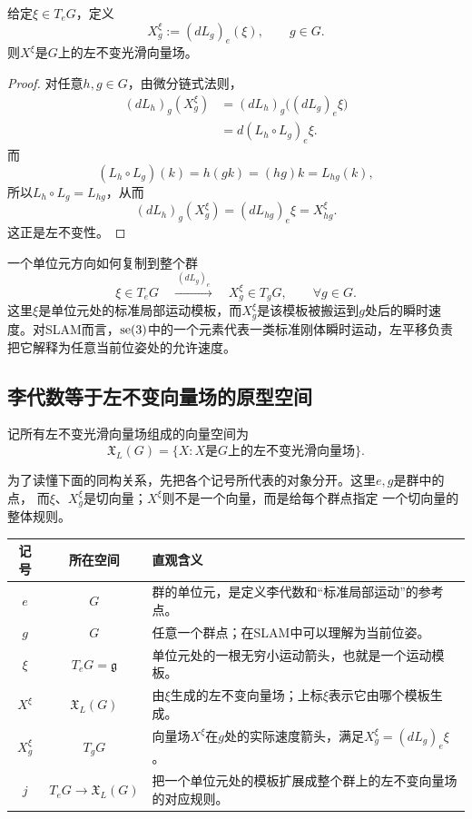 \begin{proposition}[单位元切向量生成左不变向量场]
给定$\xi\in T_eG$，定义
\[
    X^\xi_g:=(dL_g)_e(\xi),
    \qquad g\in G.
\]
则$X^\xi$是$G$上的左不变光滑向量场。
\end{proposition}

\begin{proof}
对任意$h,g\in G$，由微分链式法则，
\[
\begin{aligned}
    (dL_h)_g(X^\xi_g)
    &=(dL_h)_g\bigl((dL_g)_e\xi\bigr)\\
    &=d(L_h\circ L_g)_e\xi.
\end{aligned}
\]
而
\[
    (L_h\circ L_g)(k)=h(gk)=(hg)k=L_{hg}(k),
\]
所以$L_h\circ L_g=L_{hg}$，从而
\[
    (dL_h)_g(X^\xi_g)=(dL_{hg})_e\xi=X^\xi_{hg}.
\]
这正是左不变性。
\end{proof}

\begin{lieexample}{一个单位元方向如何复制到整个群}
\[
    \xi\in T_eG
    \quad\xrightarrow{\ (dL_g)_e\ }\quad
    X^\xi_g\in T_gG,
    \qquad\forall g\in G.
\]
这里$\xi$是单位元处的标准局部运动模板，而$X^\xi_g$是该模板被搬运到$g$处后的瞬时速度。对SLAM而言，$\operatorname{se}(3)$中的一个元素代表一类标准刚体瞬时运动，左平移负责把它解释为任意当前位姿处的允许速度。
\end{lieexample}

\subsection{李代数等于左不变向量场的原型空间}

记所有左不变光滑向量场组成的向量空间为
\[
    \mathfrak X_L(G)=\{X:X\text{是}G\text{上的左不变光滑向量场}\}.
\]

为了读懂下面的同构关系，先把各个记号所代表的对象分开。这里$e,g$是群中的点，
而$\xi$、$X_g^\xi$是切向量；$X^\xi$则不是一个向量，而是给每个群点指定
一个切向量的整体规则。
\begin{center}
\renewcommand{\arraystretch}{1.35}
\begin{tabular}{c|c|p{}}
    记号 & 所在空间 & 直观含义 \\
    \hline
    $e$ & $G$ & 群的单位元，是定义李代数和“标准局部运动”的参考点。 \\
    $g$ & $G$ & 任意一个群点；在SLAM中可以理解为当前位姿。 \\
    $\xi$ & $T_eG=\mathfrak g$ & 单位元处的一根无穷小运动箭头，也就是一个运动模板。 \\
    $X^\xi$ & $\mathfrak X_L(G)$ & 由$\xi$生成的左不变向量场；上标$\xi$表示它由哪个模板生成。 \\
    $X_g^\xi$ & $T_gG$ & 向量场$X^\xi$在$g$处的实际速度箭头，满足$X_g^\xi=(dL_g)_e\xi$。 \\
    $j$ & $T_eG\to\mathfrak X_L(G)$ & 把一个单位元处的模板扩展成整个群上的左不变向量场的对应规则。 \\
\end{tabular}
\end{center}

